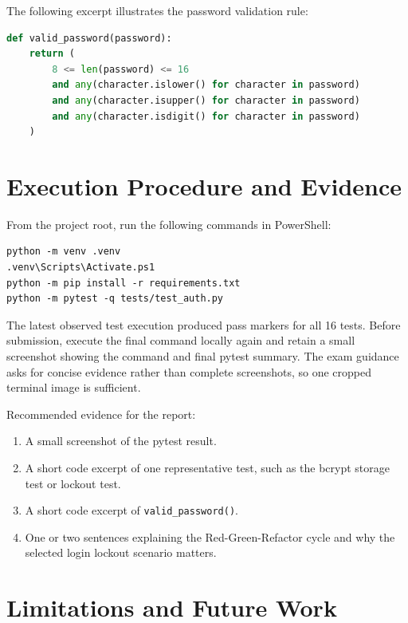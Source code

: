 \documentclass[11pt,a4paper]{article}
\begin{document}
The following excerpt illustrates the password validation rule:

\begin{lstlisting}[language=Python, caption={Password validation rule.}]
def valid_password(password):
    return (
        8 <= len(password) <= 16
        and any(character.islower() for character in password)
        and any(character.isupper() for character in password)
        and any(character.isdigit() for character in password)
    )
\end{lstlisting}

\section{Execution Procedure and Evidence}

From the project root, run the following commands in PowerShell:

\begin{lstlisting}[caption={Test execution commands.}]
python -m venv .venv
.venv\Scripts\Activate.ps1
python -m pip install -r requirements.txt
python -m pytest -q tests/test_auth.py
\end{lstlisting}

The latest observed test execution produced pass markers for all 16 tests. Before
submission, execute the final command locally again and retain a small screenshot
showing the command and final pytest summary. The exam guidance asks for concise
evidence rather than complete screenshots, so one cropped terminal image is
sufficient.

Recommended evidence for the report:

\begin{enumerate}[leftmargin=*]
    \item A small screenshot of the pytest result.
    \item A short code excerpt of one representative test, such as the bcrypt
    storage test or lockout test.
    \item A short code excerpt of \texttt{valid\_password()}.
    \item One or two sentences explaining the Red-Green-Refactor cycle and why
    the selected login lockout scenario matters.
\end{enumerate}

\section{Limitations and Future Work}
\end{document}
